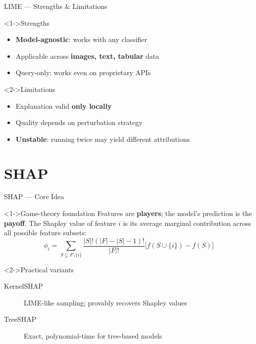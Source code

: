 \documentclass[aspectratio=169]{beamer}
\newcommand{\highlight}[1]{\textcolor{xaiaccent}{\textbf{#1}}}
\begin{document}
\begin{frame}{LIME --- Strengths \& Limitations}
  \begin{exampleblock}<1->{Strengths}
    \begin{itemize}
      \item \textbf{Model-agnostic}: works with any classifier
      \item Applicable across \textbf{images, text, tabular} data
      \item Query-only: works even on proprietary APIs
    \end{itemize}
  \end{exampleblock}
  \vspace{0.5em}
  \begin{alertblock}<2->{Limitations}
    \begin{itemize}
      \item Explanation valid \textbf{only locally}
      \item Quality depends on perturbation strategy
      \item \highlight{Unstable}: running twice may yield different attributions
    \end{itemize}
  \end{alertblock}
\end{frame}

\section{SHAP}

\begin{frame}{SHAP --- Core Idea}
  \begin{block}<1->{Game-theory foundation}
    Features are \textbf{players}; the model's prediction is the \textbf{payoff}.
    The Shapley value of feature $i$ is its average marginal contribution
    across all possible feature subsets:
    \[
      \phi_i = \sum_{S \subseteq F\setminus\{i\}}
      \frac{|S|!(|F|-|S|-1)!}{|F|!}
      \bigl[f(S\cup\{i\}) - f(S)\bigr]
    \]
  \end{block}
  \vspace{0.4em}
  \begin{block}<2->{Practical variants}
    \begin{description}
      \item[KernelSHAP] LIME-like sampling; provably recovers Shapley values
      \item[TreeSHAP] Exact, polynomial-time for tree-based models
    \end{description}
  \end{block}
\end{frame}
\end{document}
